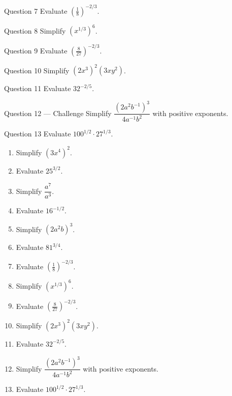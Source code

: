 \documentclass[11pt]{article}
\begin{document}
\begin{qbox}{Question 7}
Evaluate $\left(\tfrac18\right)^{-2/3}$.\workspace{2.4cm}
\end{qbox}

\begin{qbox}{Question 8}
Simplify $(x^{1/3})^6$.\workspace{2.4cm}
\end{qbox}

\begin{qbox}{Question 9}
Evaluate $\left(\tfrac{8}{27}\right)^{-2/3}$.\workspace{2.4cm}
\end{qbox}

\begin{qbox}{Question 10}
Simplify $(2x^3)^2(3xy^2)$.\workspace{2.4cm}
\end{qbox}

\begin{qbox}{Question 11}
Evaluate $32^{-2/5}$.\workspace{2.4cm}
\end{qbox}

\begin{qbox}{Question 12 --- Challenge}
Simplify $\dfrac{(2a^2b^{-1})^3}{4a^{-1}b^2}$ with positive exponents.\workspace{3cm}
\end{qbox}

\begin{qbox}{Question 13}
Evaluate $100^{1/2}\cdot 27^{1/3}$.\workspace{2.4cm}
\end{qbox}

\clearpage
{}

\begin{recapbox}
\begin{multicols}{2}
\small
\begin{enumerate}[leftmargin=*,itemsep=3pt]
  \item Simplify $(3x^4)^2$.
  \item Evaluate $25^{3/2}$.
  \item Simplify $\dfrac{a^7}{a^3}$.
  \item Evaluate $16^{-1/2}$.
  \item Simplify $(2a^2b)^3$.
  \item Evaluate $81^{3/4}$.
  \item Evaluate $\left(\tfrac18\right)^{-2/3}$.
  \item Simplify $(x^{1/3})^6$.
  \item Evaluate $\left(\tfrac{8}{27}\right)^{-2/3}$.
  \item Simplify $(2x^3)^2(3xy^2)$.
  \item Evaluate $32^{-2/5}$.
  \item Simplify $\dfrac{(2a^2b^{-1})^3}{4a^{-1}b^2}$ with positive exponents.
  \item Evaluate $100^{1/2}\cdot 27^{1/3}$.
\end{enumerate}
\end{multicols}
\end{recapbox}
\end{document}
